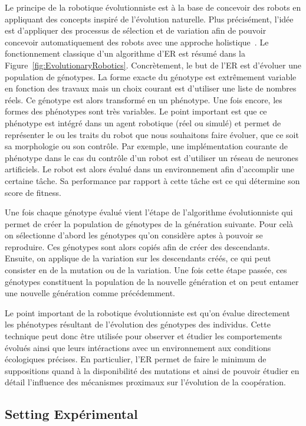    Le principe de la robotique évolutionniste est à la base de concevoir des robots en appliquant des concepts inspiré de l'évolution naturelle. Plus précisément, l'idée est d'appliquer des processus de sélection et de variation afin de pouvoir concevoir automatiquement des robots avec une approche holistique~\parencite{Nolfi2000, Doncieux2015a}. Le fonctionnement classique d'un algorithme d'ER est résumé dans la Figure~\ref{fig:EvolutionaryRobotics}. Concrètement, le but de l'ER est d'évoluer une population de génotypes. La forme exacte du génotype est extrêmement variable en fonction des travaux mais un choix courant est d'utiliser une liste de nombres réels. Ce génotype est alors transformé en un phénotype. Une fois encore, les formes des phénotypes sont très variables. Le point important est que ce phénotype est intégré dans un agent robotique (réel ou simulé) et permet de représenter le ou les traits du robot que nous souhaitons faire évoluer, que ce soit sa morphologie ou son contrôle. Par exemple, une implémentation courante de phénotype dans le cas du contrôle d'un robot est d'utiliser un réseau de neurones artificiels. Le robot est alors évalué dans un environnement afin d'accomplir une certaine tâche. Sa performance par rapport à cette tâche est ce qui détermine son score de fitness. 

    Une fois chaque génotype évalué vient l'étape de l'algorithme évolutionniste qui permet de créer la population de génotypes de la génération suivante. Pour celà on sélectionne d'abord les génotypes qu'on considère aptes à pouvoir se reproduire. Ces génotypes sont alors copiés afin de créer des descendants. Ensuite, on applique de la variation sur les descendants créés, ce qui peut consister en de la mutation ou de la variation. Une fois cette étape passée, ces génotypes constituent la population de la nouvelle génération et on peut entamer une nouvelle génération comme précédemment.

    Le point important de la robotique évolutionniste est qu'on évalue directement les phénotypes résultant de l'évolution des génotypes des individus. Cette technique peut donc être utilisée pour observer et étudier les comportements évolués ainsi que leurs intéractions avec un environnement aux conditions écologiques précises. En particulier, l'ER permet de faire le minimum de suppositions quand à la disponibilité des mutations et ainsi de pouvoir étudier en détail l'influence des mécanismes proximaux sur l'évolution de la coopération.


   \subsection{Setting Expérimental}

